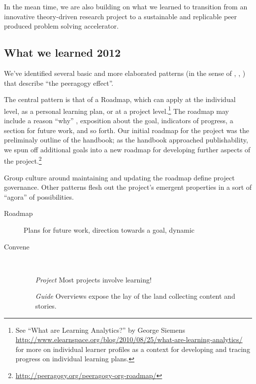 \documentclass{acm_proc_article-sp}
\begin{document}
In the mean time, we are also building on what we learned to
transition from an innovative theory-driven research project to a
sustainable and replicable peer produced problem solving accelerator.

\newpage
\subsection{What we learned 2012}

We've identified several basic and more elaborated patterns (in the
sense of \cite{Origins}, \cite{Tales}, \cite{vlissides1995design})
that describe ``the peeragogy effect''.

The central pattern is that of a Roadmap, which can apply at the
individual level, as a personal learning plan, or at a project
level.\footnote{See ``What are Learning Analytics?'' by George Siemens
  \url{http://www.elearnspace.org/blog/2010/08/25/what-are-learning-analytics/}
  for more on individual learner profiles as a context for developing
  and tracing progress on individual learning plans.}  The roadmap may
include a reason ``why'' \cite{sinek2009start}, exposition about the
goal, indicators of progress, a section for future work, and so forth.
Our initial roadmap for the project was the preliminaly outline of the
handbook; as the handbook approached publishability, we spun off
additional goals into a new roadmap for developing further aspects of
the
project.\footnote{\url{http://peeragogy.org/peeragogy-org-roadmap/}}

Group culture around maintaining and updating the roadmap define
project governance.  Other patterns flesh out the project's emergent
properties in a sort of ``agora'' of possibilities.

\hspace{.2in}
\begin{minipage}{.4\textwidth}
\begin{description}
\item[Roadmap] Plans for future work, direction towards a goal, dynamic
\item[Convene] \quad \\[-.1in]
\begin{itemize}
\item[\emph{Project}] Most projects involve learning!
\item[\emph{Guide}] Overviews expose the lay of the land collecting content
  and stories.
\end{itemize}
\end{description}
\end{minipage}
\end{document}
